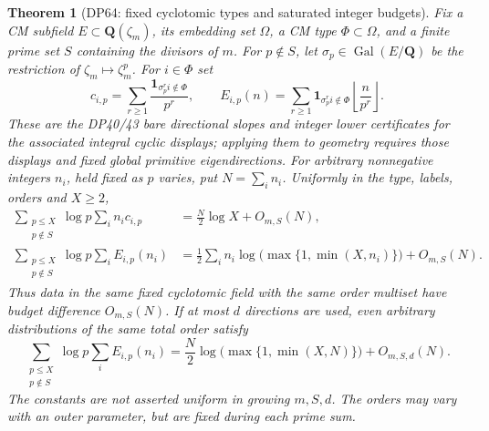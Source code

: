 \documentclass[11pt,a4paper]{article}
\newtheorem{theorem}{Theorem}[section]
\theoremstyle{definition}\newtheorem{remark}[theorem]{Remark}
\begin{document}
\begin{theorem}[DP64: fixed cyclotomic types and saturated integer budgets]\label{DP64}
Fix a CM subfield $E\subset\mathbf Q(\zeta_m)$, its embedding set
$\Omega$, a CM type $\Phi\subset\Omega$, and a finite prime set $S$
containing the divisors of $m$.
For $p\notin S$, let $\sigma_p\in\operatorname{Gal}(E/\mathbf Q)$
be the restriction of $\zeta_m\mapsto\zeta_m^p$.
For $i\in\Phi$ set
\[
 c_{i,p}=\sum_{r\ge1}\frac{\mathbf1_{\sigma_p^ri\notin\Phi}}{p^r},
 \qquad E_{i,p}(n)=\sum_{r\ge1}\mathbf1_{\sigma_p^ri\notin\Phi}
                     \left\lfloor\frac n{p^r}\right\rfloor.
\]
These are the DP40/43 bare directional slopes and integer lower
certificates for the associated integral cyclic displays; applying
them to geometry requires those displays and fixed global primitive
eigendirections.
For arbitrary nonnegative integers $n_i$, held fixed as $p$ varies,
put $N=\sum_i n_i$. Uniformly in the type, labels, orders and $X\ge2$,
\begin{align}
 \sum_{\substack{p\le X\\p\notin S}}\log p\sum_i n_i c_{i,p}
 &=\frac N2\log X+O_{m,S}(N),\label{eq:generalcmlinear}\\
 \sum_{\substack{p\le X\\p\notin S}}\log p\sum_i E_{i,p}(n_i)
 &=\frac12\sum_i n_i\log\bigl(\max\{1,\min(X,n_i)\}\bigr)
       +O_{m,S}(N).\label{eq:generalcmfloors}
\end{align}
Thus data in the same fixed cyclotomic field with the same order
multiset have budget difference $O_{m,S}(N)$.
If at most $d$ directions are used, even arbitrary distributions of
the same total order satisfy
\begin{equation}\label{eq:generalcmentropy}
 \sum_{\substack{p\le X\\p\notin S}}\log p\sum_i E_{i,p}(n_i)
 =\frac N2\log\bigl(\max\{1,\min(X,N)\}\bigr)
       +O_{m,S,d}(N).
\end{equation}
The constants are not asserted uniform in growing $m,S,d$.
The orders may vary with an outer parameter, but are fixed during
each prime sum.
\end{theorem}
\end{document}

